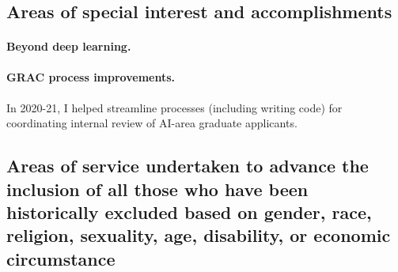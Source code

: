 \documentclass[10pt]{article}
\begin{document}




\section{}


\subsection{Areas of special interest and accomplishments}

\paragraph{Beyond deep learning.}

\paragraph{GRAC process improvements.}
In 2020-21, I helped streamline processes (including writing code) for coordinating internal review of AI-area graduate applicants.


\subsection{Areas of service undertaken to advance the inclusion of all those who have been historically excluded based on gender, race, religion, sexuality, age, disability, or economic circumstance}
\end{document}
